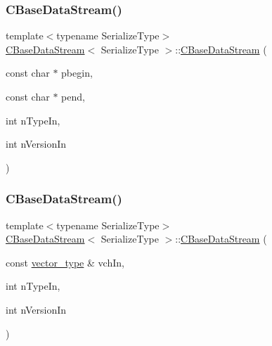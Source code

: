 \mbox{\label{class_c_base_data_stream_a2433bc0a7b7b112cf38b81af0ef898c8}} 
\subsubsection{\texorpdfstring{C\+Base\+Data\+Stream()}{CBaseDataStream()}\hspace{0.1cm}{\footnotesize\ttfamily [3/6]}}
{\footnotesize\ttfamily template$<$typename Serialize\+Type$>$ \\
\mbox{\hyperlink{class_c_base_data_stream}{C\+Base\+Data\+Stream}}$<$ Serialize\+Type $>$\+::\mbox{\hyperlink{class_c_base_data_stream}{C\+Base\+Data\+Stream}} (\begin{DoxyParamCaption}\item[{const char $\ast$}]{pbegin,  }\item[{const char $\ast$}]{pend,  }\item[{int}]{n\+Type\+In,  }\item[{int}]{n\+Version\+In }\end{DoxyParamCaption})\hspace{0.3cm}{\ttfamily [inline]}}

\mbox{\label{class_c_base_data_stream_a113389383acd7b7e48a4a54c6b713551}} 
\subsubsection{\texorpdfstring{C\+Base\+Data\+Stream()}{CBaseDataStream()}\hspace{0.1cm}{\footnotesize\ttfamily [4/6]}}
{\footnotesize\ttfamily template$<$typename Serialize\+Type$>$ \\
\mbox{\hyperlink{class_c_base_data_stream}{C\+Base\+Data\+Stream}}$<$ Serialize\+Type $>$\+::\mbox{\hyperlink{class_c_base_data_stream}{C\+Base\+Data\+Stream}} (\begin{DoxyParamCaption}\item[{const \mbox{\hyperlink{class_c_base_data_stream_a035e97a3e024a8cfa4690eaca1e5e290}{vector\+\_\+type}} \&}]{vch\+In,  }\item[{int}]{n\+Type\+In,  }\item[{int}]{n\+Version\+In }\end{DoxyParamCaption})\hspace{0.3cm}{\ttfamily [inline]}}

